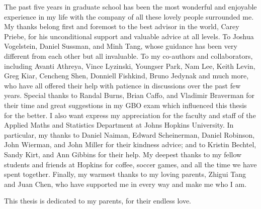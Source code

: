 \begin{frontmatter}
\begin{acknowledgment}
The past five years in graduate school has been the most wonderful and enjoyable experience in my life with the company of all these lovely people surrounded me. My thanks belong first and foremost to the best advisor in the world, Carey Priebe, for his unconditional support and valuable advice at all levels. To Joshua Vogelstein, Daniel Sussman, and Minh Tang, whose guidance has been very different from each other but all invaluable. To my co-authors and collaborators, including Avanti Athreya, Vince Lyzinski, Youngser Park, Nam Lee, Keith Levin, Greg Kiar, Cencheng Shen, Donniell Fishkind, Bruno Jedynak and much more, who have all offered their help with patience in discussions over the past few years.
Special thanks to Randal Burns, Brian Caffo, and Vladimir Braverman for their time and great suggestions in my GBO exam which influenced this thesis for the better. 
I also want express my appreciation for the faculty and staff of the Applied Maths and Statistics Department at Johns Hopkins University. In particular, my
thanks to Daniel Naiman, Edward Scheinerman, Daniel Robinson, John Wierman, and John Miller for their kindness advice; and to Kristin Bechtel, Sandy Kirt, and Ann Gibbins for their help.
My deepest thanks to my fellow students and friends at Hopkins for coffee, soccer games, and all the time we have spent together.
Finally, my warmest thanks to my loving parents, Zhigui Tang and Juan Chen, who have supported me in every way and make me who I am. 







\end{acknowledgment}

\begin{dedication}
 
This thesis is dedicated to my parents, for their endless love.

\end{dedication}

\tableofcontents


\listoffigures

\end{frontmatter}
